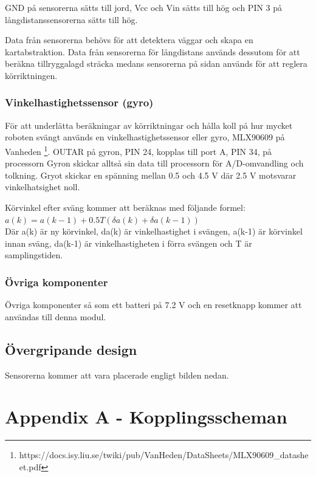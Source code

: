 \documentclass[a4paper,12pt,fleqn]{article}
\begin{document}
GND på sensorerna sätts till jord, Vcc och Vin sätts till hög och PIN 3 på långdistanssensorerna sätts till hög.
 
Data från sensorerna behövs för att detektera väggar och skapa en kartabstraktion. Data från sensorerna för långdistans används dessutom för att beräkna tillryggalagd sträcka medans sensorerna på sidan används för att reglera körriktningen.

\subsubsection{Vinkelhastighetssensor (gyro)}
För att underlätta beräkningar av körriktningar och hålla koll på hur mycket roboten svängt används en vinkelhastighetssensor eller gyro, MLX90609 på Vanheden \footnote{https://docs.isy.liu.se/twiki/pub/VanHeden/DataSheets/MLX90609\_datasheet.pdf}. OUTAR på gyron, PIN 24, kopplas till port A, PIN 34, på processorn Gyron skickar alltså sin data till processorn för A/D-omvandling och tolkning. Gryot skickar en spänning mellan 0.5 och 4.5 V där 2.5 V motsvarar vinkelhatsighet noll.

Körvinkel efter sväng kommer att beräknas med följande formel: \newline
$ a(k) = a(k-1)+0.5T(\delta a(k)+\delta a(k-1))$ \\
Där a(k) är ny körvinkel, da(k) är vinkelhastighet i svängen, a(k-1) är körvinkel innan sväng, da(k-1) är vinkelhastigheten i förra svängen och T är samplingstiden.

\subsubsection{Övriga komponenter}
Övriga komponenter så som ett batteri på 7.2 V och en resetknapp kommer att användas till denna modul.

\subsection{Övergripande design}
Sensorerna kommer att vara placerade engligt bilden nedan.


\newpage
\appendix
{}
\section{Appendix A - Kopplingsscheman}
\end{document}
